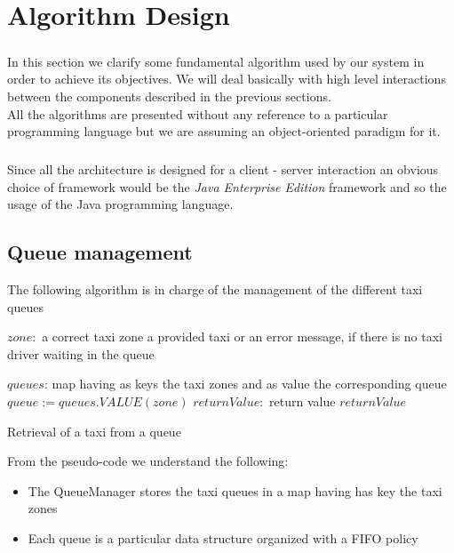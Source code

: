 \chapter{Algorithm Design}\label{chapter:algorithmDesign}
\paragraph{}In this section we clarify some fundamental algorithm used by our system in order to achieve its objectives. We will deal basically with high level interactions between the components described in the previous sections.\\
All the algorithms are presented without any reference to a particular programming language but we are assuming an object-oriented paradigm for it.
\paragraph{}Since all the architecture is designed for a client - server interaction an obvious choice of framework would be the \textit{Java Enterprise Edition} framework and so the usage of the Java programming language.

\section{Queue management}
The following algorithm is in charge of the management of the different taxi queues
\begin{algorithm}
\begin{algorithmic}
\REQUIRE $zone:$ a correct taxi zone
\ENSURE a provided taxi or an error message, if there is no taxi driver waiting in the queue \linebreak

\STATE $queues$: map having as keys the taxi zones and as value the corresponding queue \linebreak
$queue:= queues.VALUE(zone)$  
$returnValue:$ return value
\ENDIF
\RETURN $returnValue$
\end{algorithmic}
\caption{Retrieval of a taxi from a queue}
\end{algorithm}
From the pseudo-code we understand the following:
\begin{itemize}
	\item The QueueManager stores the taxi queues in a map having has key the taxi zones
	\item Each queue is a particular data structure organized with a FIFO policy
\end{itemize}


